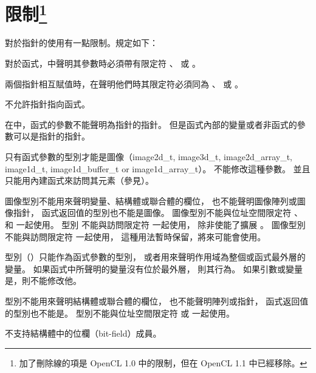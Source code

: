 \section[sec:restrictions]{限制\footnote{
加了刪除線的項是 OpenCL 1.0 中的限制，但在 OpenCL 1.1 中已經移除。}}

\startigBig

\startitem
對於指針的使用有一點限制。規定如下：
\startigBig

\startitem
對於函式，中聲明其參數時必須帶有限定符
 、  或 。
\stopitem

\startitem
兩個指針相互賦值時，在聲明他們時其限定符必須同為
 、  或 。
\stopitem

\startitem
不允許指針指向函式。
\stopitem

\startitem
在中，函式的參數不能聲明為指針的指針。
但是函式內部的變量或者非函式的參數可以是指針的指針。
\stopitem

\stopigBig
\stopitem

\startitem
只有函式參數的型別才能是圖像（image2d_t, image3d_t, image2d_array_t, image1d_t,
image1d_buffer_t or image1d_array_t）。
不能修改這種參數。
並且只能用內建函式來訪問其元素（參見）。

圖像型別不能用來聲明變量、結構體或聯合體的欄位，
也不能聲明圖像陣列或圖像指針，
函式返回值的型別也不能是圖像。
圖像型別不能與位址空間限定符
 、  和  一起使用。
型別  不能與訪問限定符  一起使用，
除非使能了擴展 。
圖像型別不能與訪問限定符  一起使用，
這種用法暫時保留，將來可能會使用。

型別（）只能作為函式參數的型別，
或者用來聲明作用域為整個或函式最外層的變量。
如果函式中所聲明的變量沒有位於最外層，
則其行為。
如果引數或變量是，則不能修改他。

型別不能用來聲明結構體或聯合體的欄位，
也不能聲明陣列或指針，
函式返回值的型別也不能是。
型別不能與位址空間限定符  或  一起使用。
\stopitem

不支持結構體中的位欄（bit-field）成員。
\stopitem

